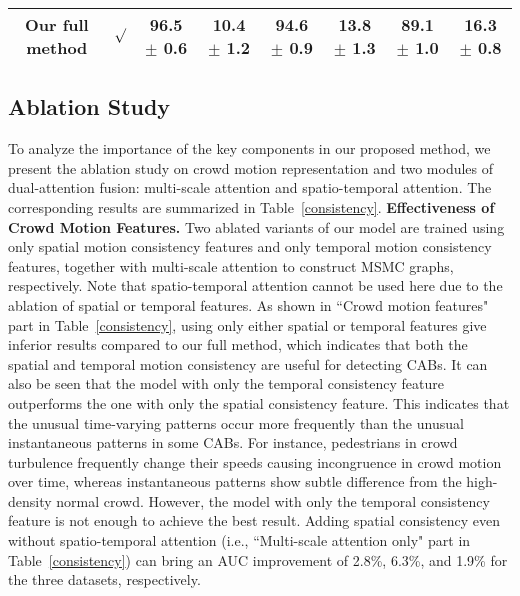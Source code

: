 \documentclass[journal]{IEEEtran}
\begin{document}
\begin{table*}[ht]
{\begin{tabular}{l|l|l|c|c|c|c|c|c}
\hline
\multicolumn{2}{c}{Our full method} & $\surd$   & \textbf{96.5 $\pm$ 0.6}  & \textbf{10.4 $\pm$ 1.2} & \textbf{94.6 $\pm$ 0.9} & \textbf{13.8 $\pm$ 1.3} & \textbf{89.1 $\pm$ 1.0} & \textbf{16.3 $\pm$ 0.8} \\
\hline
\end{tabular}
}

\end{table*}

\subsection{Ablation Study}

To analyze the importance of the key components in our proposed method, we present the ablation study on crowd motion representation and two modules of dual-attention fusion: multi-scale attention and spatio-temporal attention. The corresponding results are summarized in Table~\ref{consistency}.
\vskip 0.02in
\noindent \textbf{Effectiveness of Crowd Motion Features.}
Two ablated variants of our model are trained using only spatial motion consistency features and only temporal motion consistency features, together with multi-scale attention to construct MSMC graphs, respectively. Note that spatio-temporal attention cannot be used here due to the ablation of spatial or temporal features. As shown in ``Crowd motion features" part in Table~\ref{consistency}, using only either spatial or temporal features give inferior results compared to our full method, which indicates that both the spatial and temporal motion consistency are useful for detecting CABs. It can also be seen that the model with only the temporal consistency feature outperforms the one with only the spatial consistency feature. This indicates that the unusual time-varying patterns occur more frequently than the unusual instantaneous patterns in some CABs. For instance, pedestrians in crowd turbulence frequently change their speeds causing incongruence in crowd motion over time, whereas instantaneous patterns show subtle difference from the high-density normal crowd. However, the model with only the temporal consistency feature is not enough to achieve the best result. Adding spatial consistency even without spatio-temporal attention (i.e., ``Multi-scale attention only" part in Table~\ref{consistency}) can bring an AUC improvement of 2.8\%, 6.3\%, and 1.9\% for the three datasets, respectively.
\end{document}
